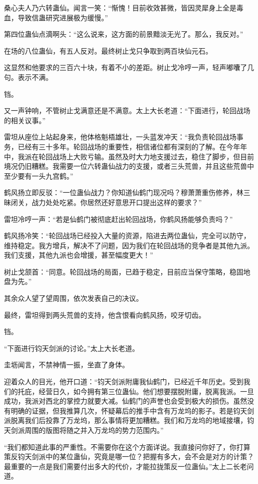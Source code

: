 \begin{this_body}
桑心夫人乃六转蛊仙。闻言一笑：“惭愧！目前收效甚微，皆因灵犀身上全是毒血，导致信蛊研究进展极为缓慢。”

第四位蛊仙点滴啊头：“这么说来，这方面的前景黯淡无光了。那么，我反对。”

在场的八位蛊仙，有五人反对。最终树止戈只争取到两百块仙元石。

这显然和他要求的三百六十块，有着不小的差距。树止戈冷哼一声，轻声嘟囔了几句。表示不满。

铛。

又一声钟响，不管树止戈满意还是不满意。太上大长老道：“下面进行，轮回战场的相关议事。”

雷坦从座位上站起身来，他体格魁梧雄壮，一头蓝发冲天：“我负责轮回战场事务，已经有三十多年。轮回战场的重要性，相信诸位都有深刻的了解。在今年年中，我派在轮回战场上大败亏输。虽然及时大力地支援过去，稳住了脚步，但目前境况仍旧糟糕。我需要一位六转蛊仙战力的支援，或者三头荒兽，并且这些荒兽中至少要有一头九宫鹤。”

鹤风扬立即反驳：“一位蛊仙战力？你知道仙鹤门现况吗？穆萧萧重伤修养，林三昧闭关，战力处处吃紧。你居然还好意思开口提出这样的要求？”

雷坦冷哼一声：“若是仙鹤门被彻底赶出轮回战场，你鹤风扬能够负责吗？”

鹤风扬冷笑：“轮回战场已经投入大量的资源，陷进去两位蛊仙，完全可以防守，维持稳定。我方增兵，解决不了问题，因为我们在轮回战场的竞争者是其他九派。我们支援，其他九派也会增援，甚至幅度更大！”

树止戈颔首：“同意。轮回战场的局面，已趋于稳定，目前应当保守策略，稳固地盘为先。”

其余众人望了望周围，依次发表自己的决议。

最终，雷坦得到两头荒兽的支持，他含恨看向鹤风扬，咬牙切齿。

铛。

“下面进行钧天剑派的讨论。”太上大长老道。

圭坜闻言，不禁神情一振，坐直了身体。

迎着众人的目光，他开口道：“钧天剑派附庸我仙鹤门，已经近千年历史。受到我们的托庇，经营日久，如今拥有第三位蛊仙。他们想要摆脱附庸，脱离我派。一旦成功，我派对西北的掌控力就要大减。仙鹤门的声誉也会受到极大的损伤。虽然没有明确的证据，但我推算几次，怀疑幕后的推手中含有万龙坞的影子。若是钧天剑派脱离我们后投靠了万龙坞，那么事情将更加糟糕。我们和万龙坞的地域接壤，钧天剑派周围的版图将随之并入万龙坞的势力范围内。”

“我们都知道此事的严重性。不需要你在这个方面详说。我直接问你好了，你打算策反钧天剑派中的某位蛊仙，究竟是哪一位？把握有多大，会不会是对方的计策？最重要的一点是我们需要付出多大的代价，才能拉拢策反一位蛊仙。”太上二长老问道。


\end{this_body}
